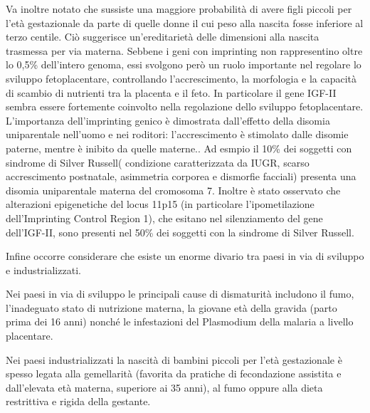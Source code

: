 Va inoltre notato che sussiste una maggiore probabilità di avere figli piccoli per l'et\`a gestazionale
da parte di quelle donne il cui peso alla nascita fosse inferiore al terzo centile.
Ciò suggerisce un'ereditarietà delle dimensioni alla nascita trasmessa per via materna. Sebbene
i geni con imprinting non rappresentino oltre lo 0,5\% dell'intero genoma, essi svolgono
però un ruolo importante nel regolare lo sviluppo fetoplacentare, controllando l'accrescimento, la 
morfologia e la capacità di scambio di nutrienti tra la placenta e il feto.
In particolare il gene IGF-II sembra essere fortemente coinvolto nella regolazione dello sviluppo
fetoplacentare. L'importanza dell'imprinting genico è dimostrata dall'effetto della disomia uniparentale
nell'uomo e nei roditori: l'accrescimento è stimolato dalle disomie paterne, mentre \`e inibito da quelle materne.\cite{fowden2006imprinted}.
Ad esmpio il 10\% dei soggetti con sindrome di Silver Russell( condizione caratterizzata da IUGR, scarso accrescimento postnatale, asimmetria corporea e dismorfie facciali) presenta una disomia uniparentale materna del cromosoma 7. Inoltre è stato osservato che alterazioni epigenetiche del locus 11p15 (in particolare l'ipometilazione dell'Imprinting Control Region 1), che esitano nel silenziamento del gene dell'IGF-II, sono presenti nel 50\% dei soggetti con la sindrome di Silver Russell.%



Infine occorre considerare che esiste un enorme divario tra paesi in via di sviluppo e industrializzati.


Nei paesi in via di sviluppo le principali cause di dismaturità includono il fumo, l'inadeguato stato di 
nutrizione materna, la giovane età della gravida (parto prima dei 16 anni) nonché le infestazioni del Plasmodium della malaria a 
livello placentare.


Nei paesi industrializzati la nascità di bambini piccoli per l'età gestazionale
è spesso legata alla gemellarità (favorita da pratiche di fecondazione assistita
e dall'elevata età materna, superiore ai 35 anni), al fumo oppure alla dieta restrittiva e rigida della gestante.



